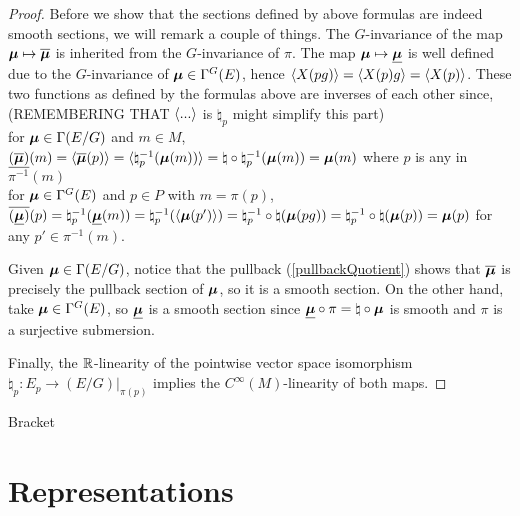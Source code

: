 \begin{proof}
Before we show that the sections defined by above formulas are indeed smooth sections, we will remark a couple of things. The $G$-invariance of the map $\bm{\mathfrak{\mu}} \mapsto \overline{\bm{\mathfrak{\mu}}}$ is inherited from the $G$-invariance of $\pi$. The map $\bm{\mu} \mapsto \underline{\bm{\mu}}$ is well defined due to the $G$-invariance of $\bm{\mu} \in \Gamma^G(E)$, hence $\langle X(pg) \rangle = \langle X(p)g \rangle = \langle X(p) \rangle$. These two functions as defined by the formulas above are inverses of each other since, (REMEMBERING THAT $\langle ... \rangle$ is $\natural_p$ might simplify this part)\\
for $\bm{\mathfrak{\mu}} \in \Gamma(E/G)$ and $m \in M$, $\underline{(\overline{\bm{\mathfrak{\mu}}})}(m) = \langle \overline{\bm{\mathfrak{\mu}}} (p) \rangle = \langle  \natural_p^{-1}(\bm{\mathfrak{\mu}}(m))  \rangle = \natural \circ \natural_p^{-1}(\bm{\mathfrak{\mu}}(m)) = \bm{\mathfrak{\mu}}(m)$ where $p$ is any in $\pi^{-1}(m)$ \\
for $\bm{\mu} \in \Gamma^G(E)$ and $p \in P$ with $m = \pi(p)$, $\overline{(\underline{\bm{\mu}})}(p) = \natural_p^{-1}(\underline{\bm{\mu}}(m)) = \natural_p^{-1}(\langle \bm{\mu}(p') \rangle) = \natural_p^{-1} \circ \natural (\bm{\mu}(pg)) = \natural_p^{-1} \circ \natural (\bm{\mu}(p)) = \bm{\mu}(p)$ for any $p' \in \pi^{-1}(m)$.

Given $\bm{\mathfrak{\mu}} \in \Gamma(E/G)$, notice that the pullback (\ref{pullbackQuotient}) shows that $\overline{\bm{\mathfrak{\mu}}}$ is precisely the pullback section of $\bm{\mathfrak{\mu}}$, so it is a smooth section. On the other hand, take $\bm{\mu} \in \Gamma^G(E)$, so $\underline{\bm{\mu}}$ is a smooth section since $\underline{\bm{\mu}} \circ \pi = \natural \circ \bm{\mu}$ is smooth and $\pi$ is a surjective submersion.

Finally, the $\mathbb{R}$-linearity of the pointwise vector space isomorphism $\natural_p:E_p \to (E/G)|_{\pi(p)}$ implies the $C^{\infty}(M)$-linearity of both maps.

\end{proof}

\linea

Bracket

\section{Representations}

